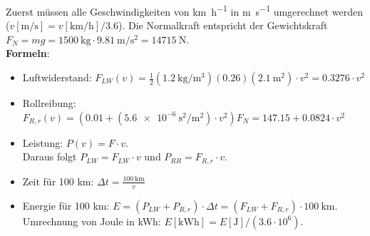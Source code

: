 \documentclass[ngerman]{scrreprt}
\newenvironment{loesungbox}[1]
  {\needspace{5\baselineskip}\begin{loesungboxstyle}[frametitle={#1}]}
  {\end{loesungboxstyle}}
\begin{document}
\begin{loesungbox}{Lösung zu \Cref{aufg:pkw_leistung}}
Zuerst müssen alle Geschwindigkeiten von \si{\kilo\meter\per\hour} in \si{\meter\per\second} umgerechnet werden ($v[\si{\meter\per\second}] = v[\si{\kilo\meter\per\hour}] / 3.6$). Die Normalkraft entspricht der Gewichtskraft $F_N = mg = \SI{1500}{\kilo\gram} \cdot \SI{9.81}{\meter\per\second\squared} = \SI{14715}{\newton}$. \\

\textbf{Formeln}:
\begin{itemize}
    \item Luftwiderstand: $F_{LW}(v) = \frac{1}{2} (\SI{1.2}{\kilo\gram\per\meter\cubed}) (\num{0.26}) (\SI{2.1}{\meter\squared}) \cdot v^2 = \num{0.3276} \cdot v^2$ 
    \item Rollreibung: $F_{R,r}(v) = (\num{0.01} + (\SI{5.6e-6}{\second\squared\per\meter\squared})\cdot  v^2) F_N = \num{147.15} + \num{0.0824} \cdot v^2$ 
    \item Leistung: $P(v) = F \cdot v$. \\
    Daraus folgt $P_{LW} = F_{LW} \cdot v$ und $P_{RR} = F_{R,r} \cdot v$. 
    \item Zeit für 100 km: $\Delta t = \frac{\SI{100}{\kilo\meter}}{v}$ 
    \item Energie für 100 km: $E = (P_{LW} + P_{R,r}) \cdot \Delta t = (F_{LW} + F_{R,r}) \cdot \SI{100}{\kilo\meter}$. \\
    Umrechnung von Joule in kWh: $E[\si{\kilo\watt\hour}] = E[\si{\joule}] / (3.6 \cdot 10^6)$. 
\end{itemize}


\end{loesungbox}
\end{document}
